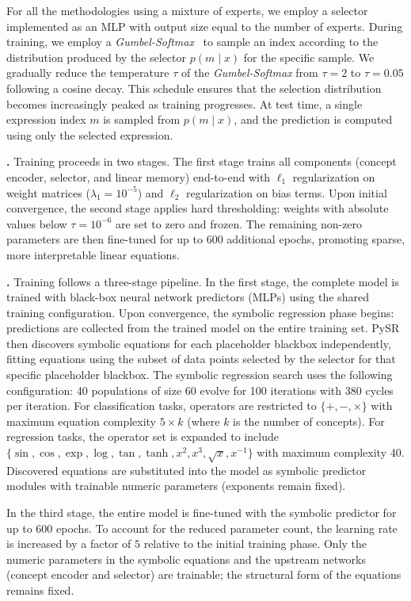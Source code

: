 \documentclass{article}
\theoremstyle{plain}
\theoremstyle{definition}
\theoremstyle{remark}
\newcommand{\mypar}[1]{\noindent\textbf{#1}}
\begin{document}
For all the methodologies using a mixture of experts, we employ a selector implemented as an MLP with output size equal to the number of experts. During training, we employ a \textit{Gumbel-Softmax}~\citep{jang2016categorical} to sample an index according to the distribution produced by the selector $p(m \mid x)$ for the specific sample. We gradually reduce the temperature $\tau$ of the \textit{Gumbel-Softmax} from $\tau=2$ to $\tau=0.05$ following a cosine decay. This schedule ensures that the selection distribution becomes increasingly peaked as training progresses. At test time, a single expression index $m$ is sampled from $p(m \mid x)$, and the prediction is computed using only the selected expression.

\mypar{\linearacro{}. }
Training proceeds in two stages. The first stage trains all components (concept encoder, selector, and linear memory) end-to-end with $\ell_1$ regularization on weight matrices ($\lambda_1 = 10^{-5}$) and $\ell_2$ regularization on bias terms. Upon initial convergence, the second stage applies hard thresholding: weights with absolute values below $\tau = 10^{-6}$ are set to zero and frozen. The remaining non-zero parameters are then fine-tuned for up to 600 additional epochs, promoting sparse, more interpretable linear equations.

\mypar{\symbolicacro{}.}
Training follows a three-stage pipeline. In the first stage, the complete model is trained with black-box neural network predictors (MLPs) using the shared training configuration. Upon convergence, the symbolic regression phase begins: predictions are collected from the trained model on the entire training set. PySR then discovers symbolic equations for each placeholder blackbox independently, fitting equations using the subset of data points selected by the selector for that specific placeholder blackbox. The symbolic regression search uses the following configuration: 40 populations of size 60 evolve for 100 iterations with 380 cycles per iteration. For classification tasks, operators are restricted to $\{+, -, \times\}$ with maximum equation complexity $5 \times k$ (where $k$ is the number of concepts). For regression tasks, the operator set is expanded to include $\{\sin, \cos, \exp, \log, \tan, \tanh, x^2, x^3, \sqrt{x}, x^{-1}\}$ with maximum complexity 40. Discovered equations are substituted into the model as symbolic predictor modules with trainable numeric parameters (exponents remain fixed).

In the third stage, the entire model is fine-tuned with the symbolic predictor for up to 600 epochs. To account for the reduced parameter count, the learning rate is increased by a factor of $5$ relative to the initial training phase. Only the numeric parameters in the symbolic equations and the upstream networks (concept encoder and selector) are trainable; the structural form of the equations remains fixed.
\end{document}
